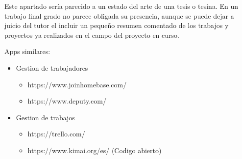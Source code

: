 
Este apartado sería parecido a un estado del arte de una tesis o tesina. En un trabajo final grado no parece obligada su presencia, aunque se puede dejar a juicio del tutor el incluir un pequeño resumen comentado de los trabajos y proyectos ya realizados en el campo del proyecto en curso. 

Apps similares:
\begin{itemize}
	\item Gestion de trabajadores
	\begin{itemize}
		\item https://www.joinhomebase.com/
		\item https://www.deputy.com/
	\end{itemize}
	\item Gestion de trabajos
	\begin{itemize}
		\item https://trello.com/
		\item https://www.kimai.org/es/ (Codigo abierto)
	\end{itemize}
\end{itemize}